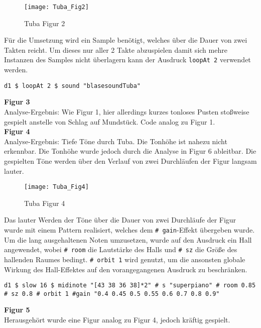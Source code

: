 \documentclass[
10pt, %
a4paper, %
oneside, %
headinclude,footinclude, %
BCOR5mm, %
]{scrartcl}
\begin{document}
\begin{figure}[h]
	\centering 
	\texttt{[image: Tuba\_Fig2]} 
	\caption{Tuba Figur 2}
\end{figure}

\noindent Für die Umsetzung wird ein Sample benötigt, welches über die Dauer von zwei Takten reicht. Um dieses nur aller 2 Takte abzuspielen damit sich mehre Instanzen des Samples nicht überlagern kann der Ausdruck \verb|loopAt 2| \cite{tid9} verwendet werden.
\begin{lstlisting}
d1 $ loopAt 2 $ sound "blasesoundTuba"
\end{lstlisting}

\noindent\textbf{Figur 3}\\
Analyse-Ergebnis: Wie Figur 1, hier allerdings kurzes tonloses Pusten stoßweise gespielt anstelle von Schlag auf Mundstück. Code analog zu Figur 1.\\

\noindent\textbf{Figur 4}\\
Analyse-Ergebnis: Tiefe Töne durch Tuba. Die Tonhöhe ist nahezu nicht erkennbar. Die Tonhöhe wurde jedoch durch die Analyse in Figur 6 ableitbar. Die gespielten Töne werden über den Verlauf von zwei Durchläufen der Figur langsam lauter.\\

\begin{figure}[h]
	\centering 
	\texttt{[image: Tuba\_Fig4]} 
	\caption{Tuba Figur 4}
\end{figure}

\noindent Das lauter Werden der Töne über die Dauer von zwei Durchläufe der Figur wurde mit einem Pattern realisiert, welches dem \verb|# gain|-Effekt übergeben wurde.\cite{tid10} Um die lang ausgehaltenen Noten umzusetzen, wurde auf den Ausdruck ein Hall angewendet, wobei \verb|# room| die Lautstärke des Halls und \verb|# sz| die Größe des hallenden Raumes bedingt. \verb|# orbit 1| wird genutzt, um die ansonsten globale Wirkung des Hall-Effektes auf den vorangegangenen Ausdruck zu beschränken. \cite{tid11} 

\begin{lstlisting}
d1 $ slow 16 $ midinote "[43 38 36 38]*2" # s "superpiano" # room 0.85 # sz 0.8 # orbit 1 #gain "0.4 0.45 0.5 0.55 0.6 0.7 0.8 0.9"
\end{lstlisting}


\noindent\textbf{Figur 5}\\
Herausgehört wurde eine Figur analog zu Figur 4, jedoch kräftig gespielt.\\
\end{document}
